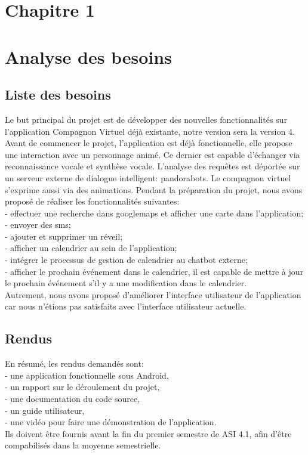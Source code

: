 \section*{Chapitre 1}
\section{Analyse des besoins}
\subsection{Liste des besoins}
Le but principal du projet est de développer des nouvelles fonctionnalités sur l'application Compagnon Virtuel déjà existante, notre version sera la version 4.
Avant de commencer le projet, l'application est déjà fonctionnelle, elle propose une interaction avec un personnage animé. Ce dernier est capable d'échanger via reconnaissance vocale et synthèse vocale. L'analyse des requêtes est déportée sur un serveur externe de dialogue intelligent: pandorabots. Le compagnon virtuel s'exprime aussi via des animations. Pendant la préparation du projet, nous avons proposé de réaliser les fonctionnalités suivantes:\\
	\indent- effectuer une recherche dans googlemaps et afficher une carte dans l'application;\\
	\indent- envoyer des sms;\\
	\indent- ajouter et supprimer un réveil;\\
	\indent- afficher un calendrier au sein de l'application;\\
	\indent- intégrer le processus de gestion de calendrier au chatbot externe;\\
	\indent- afficher le prochain événement dans le calendrier, il est capable de mettre à jour le prochain événement s'il y a une modification dans le calendrier.\\
	
Autrement, nous avons proposé d'améliorer l'interface utilisateur de l'application car nous n'étions pas satisfaits avec l'interface utilisateur actuelle.

\subsection{Rendus}
En résumé, les rendus demandés sont:\\
    \indent- une application fonctionnelle sous Android,\\
    \indent- un rapport sur le déroulement du projet,\\
    \indent- une documentation du code source,\\
    \indent- un guide utilisateur,\\
	\indent- une vidéo pour faire une démonstration de l'application.\\
\indent Ils doivent être fournis avant la fin du premier semestre de ASI 4.1, afin d'être compabilisés dans la moyenne semestrielle.
\newpage
